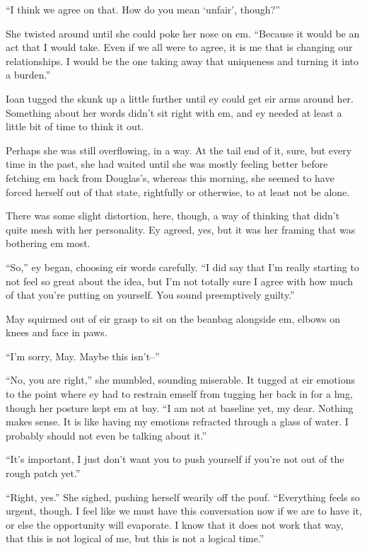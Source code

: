 ``I think we agree on that. How do you mean `unfair', though?''

She twisted around until she could poke her nose on em. ``Because it would be an act that I would take. Even if we all were to agree, it is me that is changing our relationships. I would be the one taking away that uniqueness and turning it into a burden.''

Ioan tugged the skunk up a little further until ey could get eir arms around her. Something about her words didn't sit right with em, and ey needed at least a little bit of time to think it out.

Perhaps she was still overflowing, in a way. At the tail end of it, sure, but every time in the past, she had waited until she was mostly feeling better before fetching em back from Douglas's, whereas this morning, she seemed to have forced herself out of that state, rightfully or otherwise, to at least not be alone.

There was some slight distortion, here, though, a way of thinking that didn't quite mesh with her personality. Ey agreed, yes, but it was her framing that was bothering em most.

``So,'' ey began, choosing eir words carefully. ``I did say that I'm really starting to not feel so great about the idea, but I'm not totally sure I agree with how much of that you're putting on yourself. You sound preemptively guilty.''

May squirmed out of eir grasp to sit on the beanbag alongside em, elbows on knees and face in paws.

``I'm sorry, May. Maybe this isn't--''

``No, you are right,'' she mumbled, sounding miserable. It tugged at eir emotions to the point where ey had to restrain emself from tugging her back in for a hug, though her posture kept em at bay. ``I am not at baseline yet, my dear. Nothing makes sense. It is like having my emotions refracted through a glass of water. I probably should not even be talking about it.''

``It's important, I just don't want you to push yourself if you're not out of the rough patch yet.''

``Right, yes.'' She sighed, pushing herself wearily off the pouf. ``Everything feels so urgent, though. I feel like we must have this conversation now if we are to have it, or else the opportunity will evaporate. I know that it does not work that way, that this is not logical of me, but this is not a logical time.''


